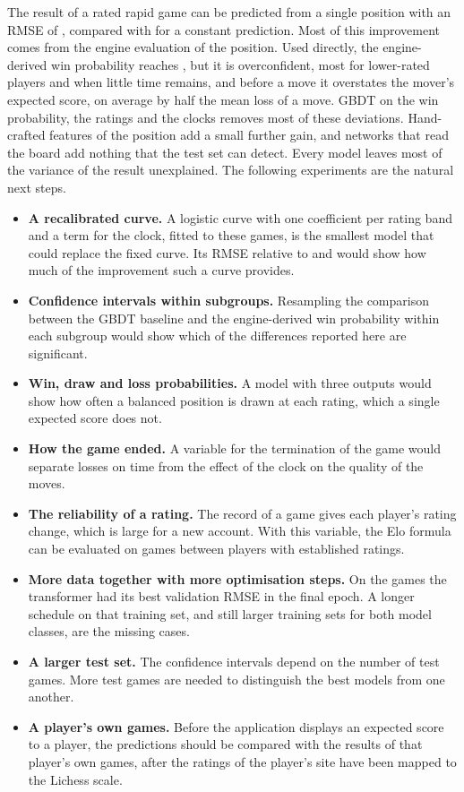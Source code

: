 \documentclass[11pt]{article}
\begin{document}
The result of a rated rapid game can be predicted from a single position with
an RMSE of , compared with  for a constant
prediction. Most of this improvement comes from the engine evaluation of the
position. Used directly, the engine-derived win probability reaches
, but it is overconfident, most for lower-rated
players and when little time remains, and before a move it overstates the
mover's expected score, on average by half the mean loss of a move. GBDT on
the win probability, the ratings and the clocks removes most of these
deviations.
Hand-crafted features of the position add a small further gain, and networks
that read the board add nothing that the test set can detect. Every model
leaves most of the variance of the result unexplained. The following
experiments are the natural next steps.
\begin{itemize}
\item \textbf{A recalibrated curve.} A logistic curve with one coefficient
per rating band and a term for the clock, fitted to these games, is the
smallest model that could replace the fixed curve. Its RMSE relative to
 and  would show how much of the
improvement such a curve provides.
\item \textbf{Confidence intervals within subgroups.} Resampling the
comparison between the GBDT baseline and the engine-derived win probability
within each subgroup would show which of the differences reported here are
significant.
\item \textbf{Win, draw and loss probabilities.} A model with three outputs
would show how often a balanced position is drawn at each rating, which a
single expected score does not.
\item \textbf{How the game ended.} A variable for the termination of the game
would separate losses on time from the effect of the clock on the quality of
the moves.
\item \textbf{The reliability of a rating.} The record of a game gives each
player's rating change, which is large for a new account. With this variable,
the Elo formula can be evaluated on games between players with established
ratings.
\ifmore
\item \textbf{More data together with more optimisation steps.} On
 the games the transformer had its best
validation RMSE in the final epoch. A longer schedule on that training set,
and still larger training sets for both model classes, are the missing cases.
\fi
\item \textbf{A larger test set.} The confidence intervals depend on the
number of test games. More test games are needed to distinguish the best
models from one another.
\item \textbf{A player's own games.} Before the application displays an
expected score to a player, the predictions should be compared with the
results of that player's own games, after the ratings of the player's site
have been mapped to the Lichess scale.
\end{itemize}
\end{document}
